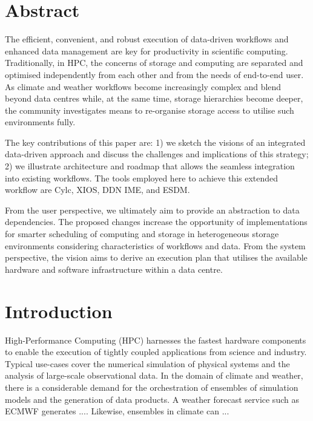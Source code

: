 \documentclass[a4paper]{article}
\title{\papertitle}
\author{Julian M. Kunkel
  \textit{University of Reading}
    \and
  Luciana R. Pedro
  \textit{University of Reading}
}
\date{\today}
\newcommand{\jk}[1]{\todo[inline]{JK: #1}}
\begin{document}
\maketitle
\thispagestyle{fancy}

\section*{Abstract}
The efficient, convenient, and robust execution of data-driven workflows and enhanced data management are key for productivity in scientific computing.
Traditionally, in HPC, the concerns of storage and computing are separated and optimised independently from each other and from the needs of end-to-end user.
As climate and weather workflows become increasingly complex and blend beyond data centres while, at the same time, storage hierarchies become deeper, the community investigates means to re-organise storage access to utilise such environments fully.

The key contributions of this paper are:
1) we sketch the visions of an integrated data-driven approach and discuss the challenges and implications of this strategy;
2) we illustrate architecture and roadmap that allows the seamless integration into existing workflows.
The tools employed here to achieve this extended workflow are Cylc, XIOS, DDN IME, and ESDM.

From the user perspective, we ultimately aim to provide an abstraction to data dependencies.
The proposed changes increase the opportunity of implementations for smarter scheduling of computing and storage in heterogeneous storage environments considering characteristics of workflows and data.
From the system perspective, the vision aims to derive an execution plan that utilises the available hardware and software infrastructure within a data centre.


\section{Introduction}

High-Performance Computing (HPC) harnesses the fastest hardware components to enable the execution of tightly coupled applications from science and industry.
Typical use-cases cover the numerical simulation of physical systems and the analysis of large-scale observational data.
In the domain of climate and weather, there is a considerable demand for the orchestration of ensembles of simulation models and the generation of data products.
A weather forecast service such as ECMWF generates .... \jk{Cylc team, please provide some facts}
Likewise, ensembles in climate can ...
\end{document}
